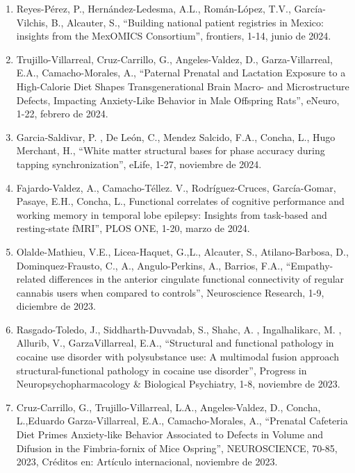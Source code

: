 \begin{enumerate}
\item Reyes-Pérez, P., Hernández-Ledesma, A.L., Román-López, T.V., García-Vilchis, B., Alcauter, S., “Building national 
patient registries in Mexico: insights from the MexOMICS Consortium”, frontiers, 1-14, junio de 2024.

\item Trujillo-Villarreal, Cruz-Carrillo, G., Angeles-Valdez, D., Garza-Villarreal, E.A., Camacho-Morales, A., “Paternal 
Prenatal and Lactation Exposure to a High-Calorie Diet Shapes Transgenerational Brain Macro- and Microstructure Defects, 
Impacting Anxiety-Like Behavior in Male Offspring Rats”, eNeuro, 1-22, febrero de 
2024.

\item Garcia-Saldivar, P. , De León, C., Mendez Salcido, F.A., Concha, L., Hugo Merchant, H., “White matter structural 
bases 
for phase accuracy during tapping synchronization”, eLife, 1-27, noviembre de 2024.

\item Fajardo-Valdez, A., Camacho-Téllez. V., Rodríguez-Cruces, García-Gomar, Pasaye, E.H., Concha, L., Functional 
correlates 
of cognitive performance and working memory in temporal lobe epilepsy: Insights from task-based and resting-state fMRI”, 
PLOS ONE, 1-20, marzo de 2024.

\item Olalde-Mathieu, V.E., Licea-Haquet, G.,L., Alcauter, S., Atilano-Barbosa, D., Dominquez-Frausto, C., A., 
Angulo-Perkins, A., Barrios, F.A., “Empathy-related differences in the anterior cingulate functional connectivity of 
regular cannabis users when compared to controls”, Neuroscience Research, 1-9, diciembre de 2023.

\item Rasgado-Toledo, J., Siddharth-Duvvadab, S., Shahc, A. , Ingalhalikarc, M. , Allurib, V., GarzaVillarreal, E.A., 
“Structural and functional pathology in cocaine use disorder with polysubstance use: A multimodal fusion approach 
structural-functional pathology in cocaine use disorder”, Progress in Neuropsychopharmacology \& Biological Psychiatry, 
1-8, noviembre de 2023.

\item Cruz-Carrillo, G., Trujillo-Villarreal, L.A., Angeles-Valdez, D., Concha, L.,Eduardo Garza-Villarreal, E.A., 
Camacho-Morales, A., “Prenatal Cafeteria Diet Primes Anxiety-like Behavior Associated to Defects in Volume and Difusion in 
the Fimbria-fornix of Mice Ospring”, NEUROSCIENCE, 70-85, 2023, Créditos en: Artículo internacional, noviembre de 2023.


\end{enumerate}
